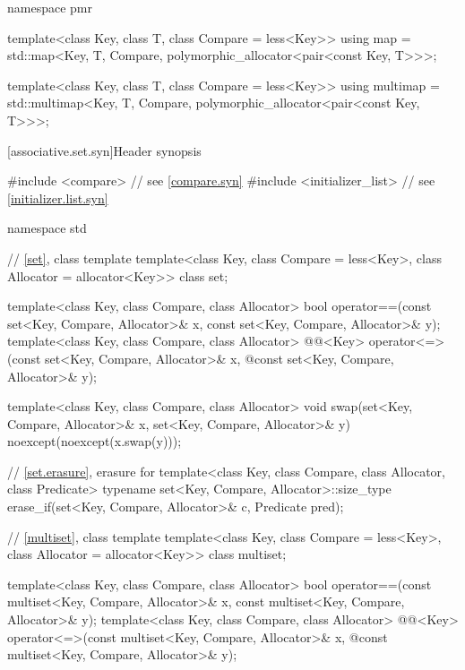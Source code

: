 \begin{codeblock}
{  namespace pmr {
    template<class Key, class T, class Compare = less<Key>>
      using map = std::map<Key, T, Compare,
                           polymorphic_allocator<pair<const Key, T>>>;

    template<class Key, class T, class Compare = less<Key>>
      using multimap = std::multimap<Key, T, Compare,
                                     polymorphic_allocator<pair<const Key, T>>>;
  }
}
\end{codeblock}

[associative.set.syn]{Header  synopsis}%

%
\begin{codeblock}
#include <compare>              // see \ref{compare.syn}
#include <initializer_list>     // see \ref{initializer.list.syn}

namespace std {
  // \ref{set}, class template 
  template<class Key, class Compare = less<Key>, class Allocator = allocator<Key>>
    class set;

  template<class Key, class Compare, class Allocator>
    bool operator==(const set<Key, Compare, Allocator>& x,
                    const set<Key, Compare, Allocator>& y);
  template<class Key, class Compare, class Allocator>
    @@<Key> operator<=>(const set<Key, Compare, Allocator>& x,
    @\itcorr@                                        const set<Key, Compare, Allocator>& y);

  template<class Key, class Compare, class Allocator>
    void swap(set<Key, Compare, Allocator>& x,
              set<Key, Compare, Allocator>& y)
      noexcept(noexcept(x.swap(y)));

  // \ref{set.erasure}, erasure for 
  template<class Key, class Compare, class Allocator, class Predicate>
    typename set<Key, Compare, Allocator>::size_type
      erase_if(set<Key, Compare, Allocator>& c, Predicate pred);

  // \ref{multiset}, class template 
  template<class Key, class Compare = less<Key>, class Allocator = allocator<Key>>
    class multiset;

  template<class Key, class Compare, class Allocator>
    bool operator==(const multiset<Key, Compare, Allocator>& x,
                    const multiset<Key, Compare, Allocator>& y);
  template<class Key, class Compare, class Allocator>
    @@<Key> operator<=>(const multiset<Key, Compare, Allocator>& x,
    @\itcorr@                                        const multiset<Key, Compare, Allocator>& y);

}
\end{codeblock}
